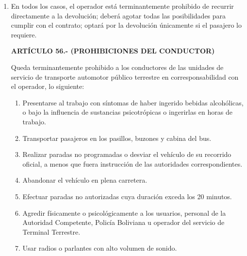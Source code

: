 \begin{enumerate}[label=\Roman*.,
		nosep, %
		itemsep=0pt, %
		parsep=0pt %
		]
\begin{enumerate}[label=\alph*),
			nosep, %
			itemsep=0pt, %
			parsep=0pt %
			]
			\item Anticipación del viaje: en caso que el operador anticipe el viaje sin avisar al pasajero, deberá proporcionarle un espacio en el siguiente viaje que le resulte conveniente a su destino final. En estos casos, el pasajero no pagará ningún excedente si el nuevo espacio correspondiera a una tarifa superior. 
		\end{enumerate}
		
		\item En todos los casos, el operador está terminantemente prohibido de recurrir directamente a la devolución; deberá agotar todas las posibilidades para cumplir con el contrato; optará por la devolución únicamente si el pasajero lo requiere.
		
		\textbf{ARTÍCULO 56.- (PROHIBICIONES DEL CONDUCTOR)}
		
		Queda terminantemente prohibido a los conductores de las unidades de servicio de transporte automotor público terrestre en corresponsabilidad con el operador, lo siguiente:
		
		\begin{enumerate}[label=\alph*),
			nosep,
			itemsep=0pt,
			parsep=0pt
			]
			\item Presentarse al trabajo con síntomas de haber ingerido bebidas alcohólicas, o bajo la influencia de sustancias psicotrópicas o ingerirlas en horas de trabajo.			
			\item Transportar pasajeros en los pasillos, buzones y cabina del bus.
			\item Realizar paradas no programadas o desviar el vehículo de su recorrido oficial, a menos que fuera instrucción de las autoridades correspondientes.
			\item Abandonar el vehículo en plena carretera.			
			\item Efectuar paradas no autorizadas cuya duración exceda los 20 minutos.
			\item Agredir físicamente o psicológicamente a los usuarios, personal de la Autoridad Competente, Policía Boliviana u operador del servicio de Terminal Terrestre.			
			\item Usar radios o parlantes con alto volumen de sonido.
			
		\end{enumerate}
		
	\end{enumerate}
		
